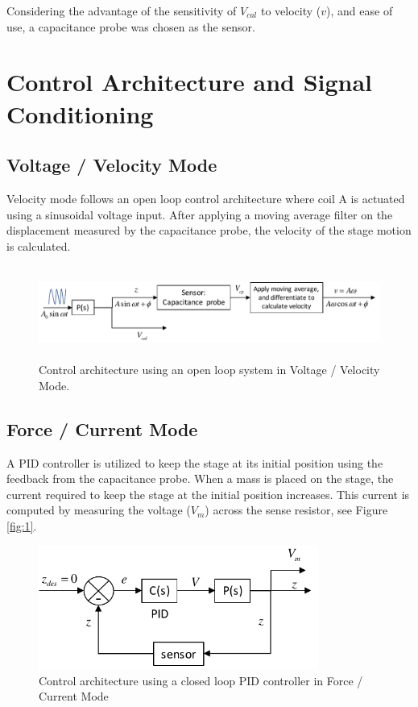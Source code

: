 \documentclass[12pt]{article}
\begin{document}
Considering the advantage of the sensitivity of $V_{cal}$  to velocity ($v$), and ease of use, a capacitance probe was chosen as the sensor.

\section{Control Architecture and Signal Conditioning}
\subsection{Voltage / Velocity Mode}
Velocity mode follows an open loop control architecture where coil A is actuated using a sinusoidal voltage input. After applying a moving average filter on the displacement measured by the capacitance probe, the velocity of the stage motion is calculated. 
\begin{figure}[ht!]
	\centering
	\includegraphics[height=1.2in]{open-loop}
	\caption{Control architecture using an open loop system in Voltage / Velocity Mode.}
	\label{fig:open-loop}
\end{figure}
\subsection{Force / Current Mode}
A PID controller is utilized to keep the stage at its initial position using the feedback from the capacitance probe. When a mass is placed on the stage, the current required to keep the stage at the initial position increases. This current is computed by measuring the voltage ($V_m$) across the sense resistor, see Figure \ref{fig:1}.
\begin{figure}[ht!]
	\centering
	\includegraphics[height=1.6in]{closed-loop}
	\caption{Control architecture using a closed loop PID controller in Force / Current Mode}
	\label{fig:closed-loop}
\end{figure}
\end{document}
